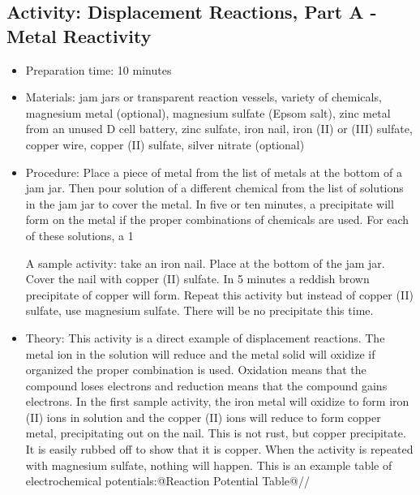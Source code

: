 \begin{itemize}
{\begin{itemize}
\subsection{Activity: Displacement Reactions, Part A - Metal Reactivity}
\begin{itemize}
\item{Preparation time: 10 minutes}
\item{Materials: jam jars or transparent reaction vessels, variety of chemicals, magnesium metal (optional), magnesium sulfate (Epsom salt), zinc metal from an unused D cell battery, zinc sulfate, iron nail, iron (II) or (III) sulfate, copper wire, copper (II) sulfate, silver nitrate (optional)}
\item{Procedure: Place a piece of metal from the list of metals at the bottom of a jam jar. Then pour solution of a different chemical from the list of solutions in the jam jar to cover the metal. In five or ten minutes, a precipitate will form on the metal if the proper combinations of chemicals are used. For each of these solutions, a 1%
\begin{itemize}
\item{Metals: magnesium, zinc, iron, copper
\item{Solutions: magnesium sulfate, zinc sulfate, iron (II) or (III) sulfate, copper (II) sulfate, silver nitrate}
\end{itemize}
A sample activity: take an iron nail. Place at the bottom of the jam jar. Cover the nail with copper (II) sulfate. In 5 minutes a reddish brown precipitate of copper will form. Repeat this activity but instead of copper (II) sulfate, use magnesium sulfate. There will be no precipitate this time.}
\item{Theory: This activity is a direct example of displacement reactions. The metal ion in the solution will reduce and the metal solid will oxidize if organized the proper combination is used. Oxidation means that the compound loses electrons and reduction means that the compound gains electrons. In the first sample activity, the iron metal will oxidize to form iron (II) ions in solution and the copper (II) ions will reduce to form copper metal, precipitating out on the nail. This is not rust, but copper precipitate. It is easily rubbed off to show that it is copper. When the activity is repeated with magnesium sulfate, nothing will happen. This is an example table of electrochemical potentials:@Reaction	Potential Table@//
}
\end{itemize}
\end{itemize}}
\end{itemize}
